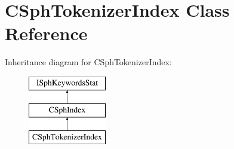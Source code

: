 \hypertarget{classCSphTokenizerIndex}{\section{C\-Sph\-Tokenizer\-Index Class Reference}
\label{classCSphTokenizerIndex}
}
Inheritance diagram for C\-Sph\-Tokenizer\-Index\-:\begin{figure}[H]
\begin{center}
\leavevmode
\includegraphics[height=3.000000cm]{classCSphTokenizerIndex}
\end{center}
\end{figure}
